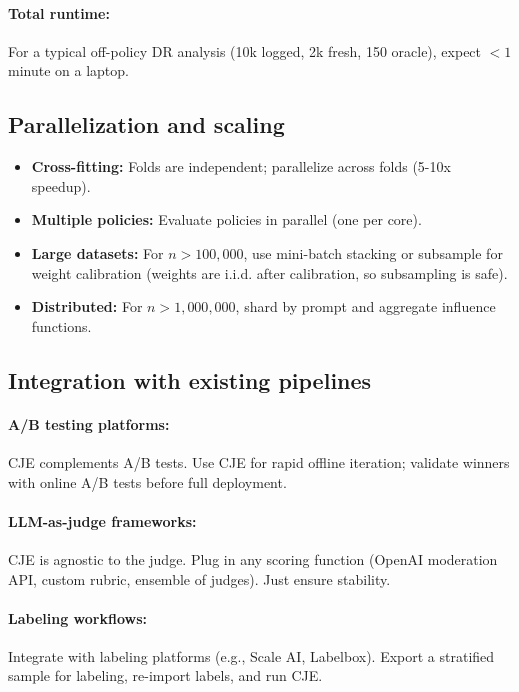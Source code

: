 \paragraph{Total runtime:} For a typical off-policy DR analysis (10k logged, 2k fresh, 150 oracle), expect $< 1$ minute on a laptop.

\subsection{Parallelization and scaling}

\begin{itemize}
\item \textbf{Cross-fitting:} Folds are independent; parallelize across folds (5-10x speedup).
\item \textbf{Multiple policies:} Evaluate policies in parallel (one per core).
\item \textbf{Large datasets:} For $n > 100{,}000$, use mini-batch stacking or subsample for weight calibration (weights are i.i.d. after calibration, so subsampling is safe).
\item \textbf{Distributed:} For $n > 1{,}000{,}000$, shard by prompt and aggregate influence functions.
\end{itemize}

\subsection{Integration with existing pipelines}

\paragraph{A/B testing platforms:} CJE complements A/B tests. Use CJE for rapid offline iteration; validate winners with online A/B tests before full deployment.

\paragraph{LLM-as-judge frameworks:} CJE is agnostic to the judge. Plug in any scoring function (OpenAI moderation API, custom rubric, ensemble of judges). Just ensure stability.

\paragraph{Labeling workflows:} Integrate with labeling platforms (e.g., Scale AI, Labelbox). Export a stratified sample for labeling, re-import labels, and run CJE.

